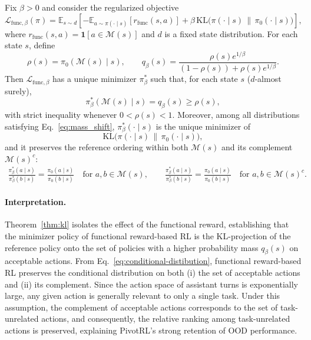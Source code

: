 \begin{theorem}
\label{thm:kl}
Fix $\beta>0$ and consider the regularized objective
\begin{equation}
\mathcal{L}_{\mathrm{func},\beta}(\pi)
=
\mathbb{E}_{s\sim d}
\left[
-
\mathbb{E}_{a\sim\pi(\cdot\mid s)}[r_{\mathrm{func}}(s,a)]
+
\beta\,\mathrm{KL}\!\bigl(\pi(\cdot\mid s)\,\|\,\pi_0(\cdot\mid s)\bigr)
\right],
\label{eq:kl_obj}
\end{equation}
where $r_{\mathrm{func}}(s,a)=\mathbf{1}[a\in \mathcal{M}(s)]$ and $d$ is a fixed state distribution. For each state $s$, define
\begin{equation}
\rho(s)=\pi_0(\mathcal{M}(s)\mid s),
\qquad
q_\beta(s)
=
\frac{\rho(s)e^{1/\beta}}{(1-\rho(s))+\rho(s)e^{1/\beta}}.
\label{eq:qbeta}
\end{equation}
Then $\mathcal{L}_{\mathrm{func},\beta}$ has a unique minimizer $\pi_\beta^*$ such that, for each state $s$ ($d$-almost surely),
\begin{equation}
\pi_\beta^*(\mathcal{M}(s)\mid s)=q_\beta(s)\ge \rho(s),
\label{eq:mass_shift}
\end{equation}
with strict inequality whenever $0<\rho(s)<1$. Moreover, among all distributions satisfying Eq.~\eqref{eq:mass_shift}, $\pi_\beta^*(\cdot\mid s)$ is the unique minimizer of
\[
\mathrm{KL}\!\bigl(\pi(\cdot\mid s)\,\|\,\pi_0(\cdot\mid s)\bigr),
\]
and it preserves the reference ordering within both $\mathcal{M}(s)$ and its complement $\mathcal{M}(s)^c$:
\begin{align}
\label{eq:conditional-distibution}
\frac{\pi_\beta^*(a\mid s)}{\pi_\beta^*(b\mid s)}
=
\frac{\pi_0(a\mid s)}{\pi_0(b\mid s)}
\quad
\text{for } a,b\in \mathcal{M}(s),
\qquad
\frac{\pi_\beta^*(a\mid s)}{\pi_\beta^*(b\mid s)}
=
\frac{\pi_0(a\mid s)}{\pi_0(b\mid s)}
\quad
\text{for } a,b\in \mathcal{M}(s)^c.
\end{align}
\end{theorem}

\paragraph{Interpretation.}
Theorem~\ref{thm:kl} isolates the effect of the functional reward, establishing that the minimizer policy of functional reward-based RL is the KL-projection of the reference policy onto the set of policies with a higher probability mass $q_\beta(s)$ on acceptable actions. From Eq.~\eqref{eq:conditional-distibution}, functional reward-based RL preserves the conditional distribution on both (i) the set of acceptable actions and (ii) its complement. Since the action space of assistant turns is exponentially large, any given action is generally relevant to only a single task. Under this assumption, the complement of acceptable actions corresponds to the set of task-unrelated actions, and consequently, the relative ranking among task-unrelated actions is preserved, explaining PivotRL's strong retention of OOD performance.